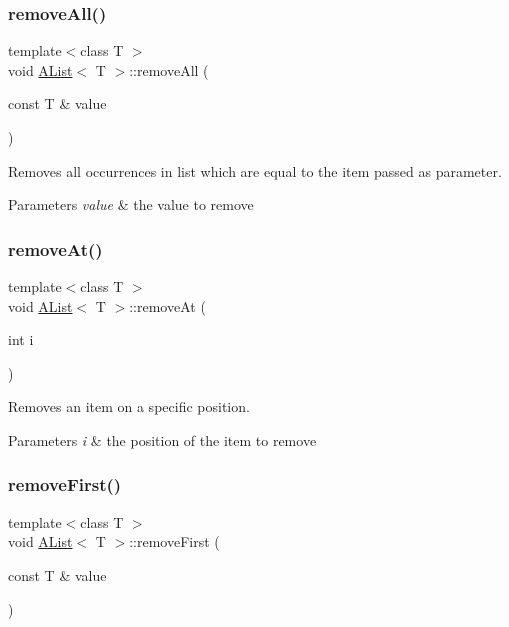 \subsubsection{\texorpdfstring{removeAll()}{removeAll()}}
{\footnotesize\ttfamily template$<$class T $>$ \\
void \mbox{\hyperlink{class_a_list}{A\+List}}$<$ T $>$\+::remove\+All (\begin{DoxyParamCaption}\item[{const T \&}]{value }\end{DoxyParamCaption})}



Removes all occurrences in list which are equal to the item passed as parameter. 


\begin{DoxyParams}{Parameters}
{\em value} & the value to remove \\
\hline
\end{DoxyParams}
\mbox{\label{class_a_list_a1b29a3946800bcb13e94668b952ae6c2}} 
\subsubsection{\texorpdfstring{removeAt()}{removeAt()}}
{\footnotesize\ttfamily template$<$class T $>$ \\
void \mbox{\hyperlink{class_a_list}{A\+List}}$<$ T $>$\+::remove\+At (\begin{DoxyParamCaption}\item[{int}]{i }\end{DoxyParamCaption})}



Removes an item on a specific position. 


\begin{DoxyParams}{Parameters}
{\em i} & the position of the item to remove \\
\hline
\end{DoxyParams}
\mbox{\label{class_a_list_aa4ac4af0fb772a55168ddcba13c508c3}} 
\subsubsection{\texorpdfstring{removeFirst()}{removeFirst()}}
{\footnotesize\ttfamily template$<$class T $>$ \\
void \mbox{\hyperlink{class_a_list}{A\+List}}$<$ T $>$\+::remove\+First (\begin{DoxyParamCaption}\item[{const T \&}]{value }\end{DoxyParamCaption})}



